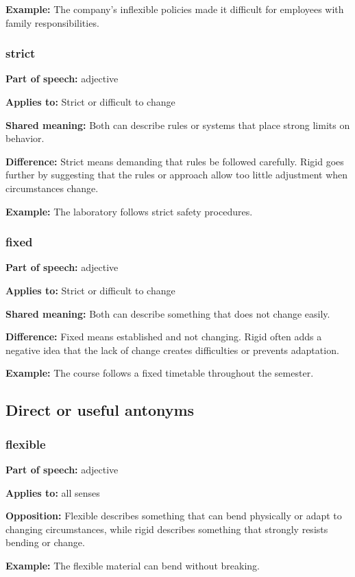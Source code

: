 \documentclass[11pt]{article}
\begin{document}
\textbf{Example:} The company's inflexible policies made it difficult for employees with family responsibilities.

\subsubsection{strict}
\textbf{Part of speech:} adjective

\textbf{Applies to:} Strict or difficult to change

\textbf{Shared meaning:} Both can describe rules or systems that place strong limits on behavior.

\textbf{Difference:} Strict means demanding that rules be followed carefully. Rigid goes further by suggesting that the rules or approach allow too little adjustment when circumstances change.

\textbf{Example:} The laboratory follows strict safety procedures.

\subsubsection{fixed}
\textbf{Part of speech:} adjective

\textbf{Applies to:} Strict or difficult to change

\textbf{Shared meaning:} Both can describe something that does not change easily.

\textbf{Difference:} Fixed means established and not changing. Rigid often adds a negative idea that the lack of change creates difficulties or prevents adaptation.

\textbf{Example:} The course follows a fixed timetable throughout the semester.

\subsection{Direct or useful antonyms}
\subsubsection{flexible}
\textbf{Part of speech:} adjective

\textbf{Applies to:} all senses

\textbf{Opposition:} Flexible describes something that can bend physically or adapt to changing circumstances, while rigid describes something that strongly resists bending or change.

\textbf{Example:} The flexible material can bend without breaking.
\end{document}
